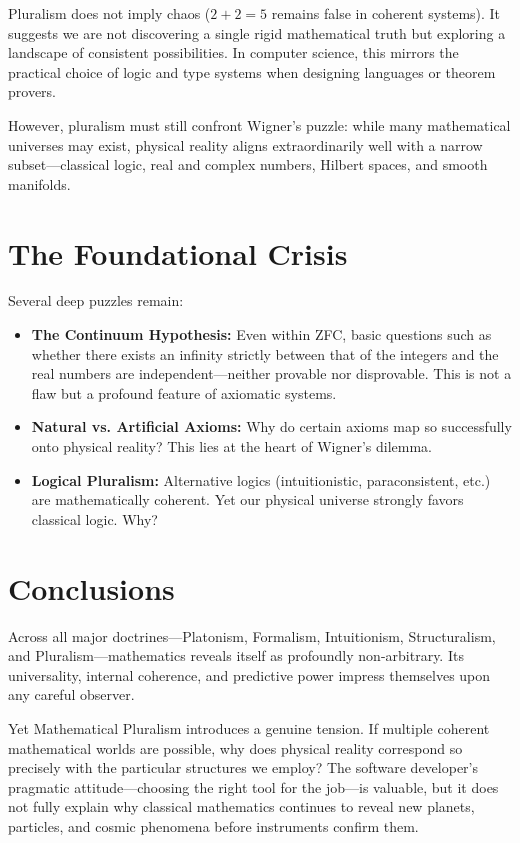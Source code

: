 Pluralism does not imply chaos ($2+2=5$ remains false in coherent systems).
It suggests we are not discovering a single rigid mathematical truth but exploring a landscape of consistent possibilities.
In computer science, this mirrors the practical choice of logic and type systems when designing languages or theorem provers.

However, pluralism must still confront Wigner's puzzle: while many mathematical universes may exist, physical reality aligns extraordinarily well with a narrow subset---classical logic, real and complex numbers, Hilbert spaces, and smooth manifolds.

\section{The Foundational Crisis}

Several deep puzzles remain:

\begin{itemize}
\item \textbf{The Continuum Hypothesis:} Even within ZFC, basic questions such as whether there exists an infinity strictly between that of the integers and the real numbers are independent---neither provable nor disprovable. This is not a flaw but a profound feature of axiomatic systems.
\item \textbf{Natural vs. Artificial Axioms:} Why do certain axioms map so successfully onto physical reality? This lies at the heart of Wigner's dilemma.
\item \textbf{Logical Pluralism:} Alternative logics (intuitionistic, paraconsistent, etc.) are mathematically coherent. Yet our physical universe strongly favors classical logic. Why?
\end{itemize}

\section{Conclusions}

Across all major doctrines---Platonism, Formalism, Intuitionism, Structuralism, and Pluralism---mathematics reveals itself as profoundly non-arbitrary.
Its universality, internal coherence, and predictive power impress themselves upon any careful observer.

Yet Mathematical Pluralism introduces a genuine tension.
If multiple coherent mathematical worlds are possible, why does physical reality correspond so precisely with the particular structures we employ? The software developer's pragmatic attitude---choosing the right tool for the job---is valuable, but it does not fully explain why classical mathematics continues to reveal new planets, particles, and cosmic phenomena before instruments confirm them.


